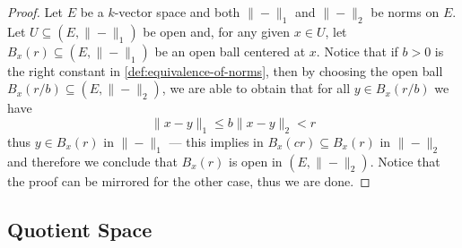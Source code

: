 \begin{proof}
Let \(E\) be a \(k\)-vector space and both \(\| - \|_1\) and \(\| - \|_2\) be
norms on \(E\). Let \(U \subseteq (E, \| - \|_1)\) be open and, for any given
\(x \in U\), let \(B_x(r) \subseteq (E, \| - \|_1)\) be an open ball centered at
\(x\). Notice that if \(b > 0\) is the right constant in
\cref{def:equivalence-of-norms}, then by choosing the open ball \(B_x(r/b)
\subseteq (E, \| - \|_2)\), we are able to obtain that for all \(y \in
B_x(r/b)\) we have
\[
\| x - y \|_1 \leq b \| x - y \|_2 < r
\]
thus \(y \in B_x(r)\) in \(\| - \|_1\) --- this implies in \(B_x(c r) \subseteq
B_x(r)\) in \(\| - \|_2\) and therefore we conclude that \(B_x(r)\) is open in
\((E, \| - \|_2)\). Notice that the proof can be mirrored for the other case,
thus we are done.
\end{proof}

\subsection{Quotient Space}

